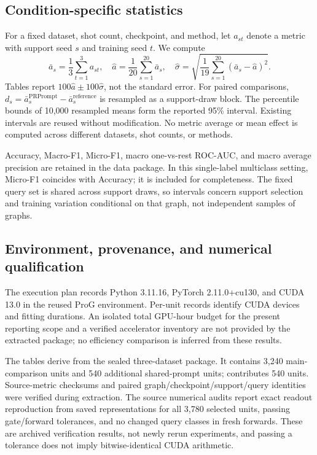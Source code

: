 \subsection{Condition-specific statistics}
For a fixed dataset, shot count, checkpoint, and method, let $a_{st}$ denote a metric with support seed $s$ and training seed $t$. We compute
\begin{equation}
\bar a_s=\frac13\sum_{t=1}^{3}a_{st},\quad
\widehat a=\frac1{20}\sum_{s=1}^{20}\bar a_s,\quad
\widehat\sigma=\sqrt{\frac1{19}\sum_{s=1}^{20}(\bar a_s-\widehat a)^2}.
\label{eq:stats}
\end{equation}
Tables report $100\widehat a\pm100\widehat\sigma$, not the standard error. For paired comparisons, $d_s=\bar a_s^{\mathrm{PRPrompt}}-\bar a_s^{\mathrm{reference}}$ is resampled as a support-draw block. The percentile bounds of 10,000 resampled means form the reported 95\% interval. Existing intervals are reused without modification. No metric average or mean effect is computed across different datasets, shot counts, or methods.

Accuracy, Macro-F1, Micro-F1, macro one-vs-rest ROC-AUC, and macro average precision are retained in the data package. In this single-label multiclass setting, Micro-F1 coincides with Accuracy; it is included for completeness. The fixed query set is shared across support draws, so intervals concern support selection and training variation conditional on that graph, not independent samples of graphs.

\subsection{Environment, provenance, and numerical qualification}
The execution plan records Python 3.11.16, PyTorch 2.11.0+cu130, and CUDA 13.0 in the reused ProG environment. Per-unit records identify CUDA devices and fitting durations. An isolated total GPU-hour budget for the present reporting scope and a verified accelerator inventory are not provided by the extracted package; no efficiency comparison is inferred from these results.

The tables derive from the sealed three-dataset package. It contains 3,240 main-comparison units and 540 additional shared-prompt units; \method{} contributes 540 units. Source-metric checksums and paired graph/checkpoint/support/query identities were verified during extraction. The source numerical audits report exact readout reproduction from saved representations for all 3,780 selected units, passing gate/forward tolerances, and no changed query classes in fresh forwards. These are archived verification results, not newly rerun experiments, and passing a tolerance does not imply bitwise-identical CUDA arithmetic.

